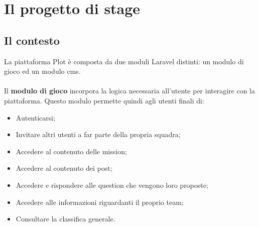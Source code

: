 
\chapter{Il progetto di stage}
\label{cap:progetto-stage}

\section{Il contesto}
\label{sec:contesto}
La piattaforma Plot è composta da due moduli Laravel distinti: un modulo di gioco ed un modulo \gls{cms}\glsfirstoccur.
\\ \\
Il \textbf{modulo di gioco} incorpora la logica necessaria all'utente per interagire con la piattaforma. Questo modulo permette quindi agli utenti finali di:
\begin{itemize}
	\item Autenticarsi;
	\item Invitare altri utenti a far parte della propria squadra;
	\item Accedere al contenuto delle mission;
	\item Accedere al contenuto dei post;
	\item Accedere e rispondere alle question che vengono loro proposte;
	\item Accedere alle informazioni riguardanti il proprio team;
	\item Consultare la classifica generale.
\end{itemize}

